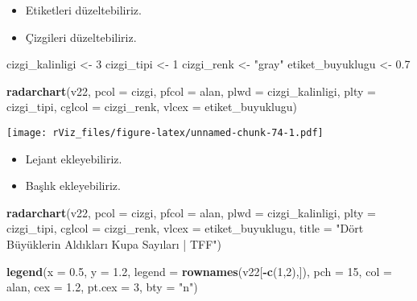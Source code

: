 \documentclass[
]{book}
\newenvironment{Shaded}{\begin{snugshade}}{\end{snugshade}}
\newcommand{\DataTypeTok}[1]{\textcolor[rgb]{0.13,0.29,0.53}{#1}}
\newcommand{\DecValTok}[1]{\textcolor[rgb]{0.00,0.00,0.81}{#1}}
\newcommand{\FloatTok}[1]{\textcolor[rgb]{0.00,0.00,0.81}{#1}}
\newcommand{\KeywordTok}[1]{\textcolor[rgb]{0.13,0.29,0.53}{\textbf{#1}}}
\newcommand{\NormalTok}[1]{#1}
\newcommand{\OperatorTok}[1]{\textcolor[rgb]{0.81,0.36,0.00}{\textbf{#1}}}
\newcommand{\StringTok}[1]{\textcolor[rgb]{0.31,0.60,0.02}{#1}}
\begin{document}
\begin{itemize}
\item
  Etiketleri düzeltebiliriz.
\item
  Çizgileri düzeltebiliriz.
\end{itemize}

\begin{Shaded}
\begin{Highlighting}[]
\NormalTok{cizgi_kalinligi <-}\StringTok{ }\DecValTok{3}
\NormalTok{cizgi_tipi <-}\StringTok{ }\DecValTok{1}
\NormalTok{cizgi_renk <-}\StringTok{ "gray"}
\NormalTok{etiket_buyuklugu <-}\StringTok{ }\FloatTok{0.7}

\KeywordTok{radarchart}\NormalTok{(v22,}
           \DataTypeTok{pcol =}\NormalTok{ cizgi,}
           \DataTypeTok{pfcol =}\NormalTok{ alan,}
           \DataTypeTok{plwd =}\NormalTok{ cizgi_kalinligi,}
           \DataTypeTok{plty =}\NormalTok{ cizgi_tipi,}
           \DataTypeTok{cglcol =}\NormalTok{ cizgi_renk,}
           \DataTypeTok{vlcex =}\NormalTok{ etiket_buyuklugu)}
\end{Highlighting}
\end{Shaded}

\texttt{[image: rViz\_files/figure-latex/unnamed-chunk-74-1.pdf]}

\begin{itemize}
\item
  Lejant ekleyebiliriz.
\item
  Başlık ekleyebiliriz.
\end{itemize}

\begin{Shaded}
\begin{Highlighting}[]
\KeywordTok{radarchart}\NormalTok{(v22,}
           \DataTypeTok{pcol =}\NormalTok{ cizgi,}
           \DataTypeTok{pfcol =}\NormalTok{ alan,}
           \DataTypeTok{plwd =}\NormalTok{ cizgi_kalinligi,}
           \DataTypeTok{plty =}\NormalTok{ cizgi_tipi,}
           \DataTypeTok{cglcol =}\NormalTok{ cizgi_renk,}
           \DataTypeTok{vlcex =}\NormalTok{ etiket_buyuklugu,}
           \DataTypeTok{title =} \StringTok{"Dört Büyüklerin Aldıkları Kupa Sayıları | TFF"}\NormalTok{)}

\KeywordTok{legend}\NormalTok{(}\DataTypeTok{x =} \FloatTok{0.5}\NormalTok{,}
       \DataTypeTok{y =} \FloatTok{1.2}\NormalTok{,}
       \DataTypeTok{legend =} \KeywordTok{rownames}\NormalTok{(v22[}\OperatorTok{-}\KeywordTok{c}\NormalTok{(}\DecValTok{1}\NormalTok{,}\DecValTok{2}\NormalTok{),]),}
       \DataTypeTok{pch =} \DecValTok{15}\NormalTok{,}
       \DataTypeTok{col =}\NormalTok{ alan,}
       \DataTypeTok{cex =} \FloatTok{1.2}\NormalTok{,}
       \DataTypeTok{pt.cex =} \DecValTok{3}\NormalTok{,}
       \DataTypeTok{bty =} \StringTok{"n"}\NormalTok{)}
\end{Highlighting}
\end{Shaded}
\end{document}

